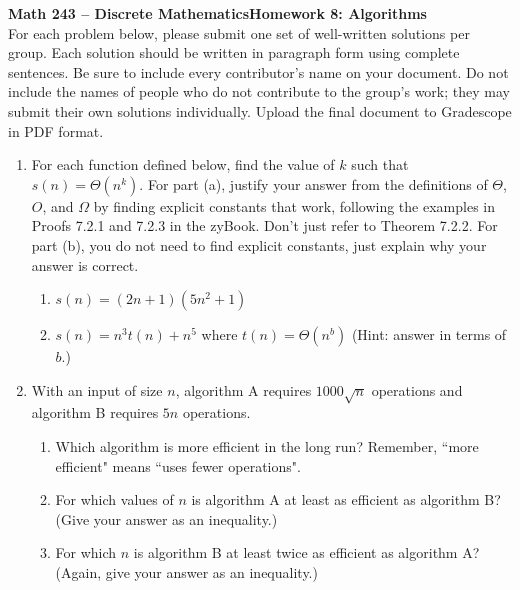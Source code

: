 \documentclass{article}
\begin{document}
\noindent\textbf{Math 243 -- Discrete Mathematics}\hfill\textbf{Homework 8: Algorithms }\\[0.0625in]

For each problem below, please submit one set of well-written solutions per group.  Each solution should be written in paragraph form using complete sentences. Be sure to include every contributor's name on your document.  Do not include the names of people who do not contribute to the group's work; they may submit their own solutions individually. Upload the final document to Gradescope in PDF format.


\begin{enumerate} 

\item For each function defined below, find the value of $k$ such that $s(n)=\Theta(n^{k})$. For part (a), justify your answer from the definitions of $\Theta$, $O$, and $\Omega$ by finding explicit constants that work, following the examples in Proofs 7.2.1 and 7.2.3 in the zyBook. Don't just refer to Theorem 7.2.2. For part (b), you do not need to find explicit constants, just explain why your answer is correct.  

\begin{enumerate}
\item $s(n)=(2n+1)(5n^{2}+1)$
\item $s(n)=n^{3}t(n)+n^{5}$ where $t(n)=\Theta(n^{b})$ (Hint: answer in
terms of $b$.)
\end{enumerate}

\item With an input of size $n$, algorithm A requires $1000\sqrt{n}$ operations
and algorithm B requires $5n$ operations. 

\begin{enumerate}
\item Which algorithm is more efficient in the long run?  Remember, ``more efficient" means ``uses fewer operations".
\item For which values of $n$ is algorithm A at least as efficient as algorithm B?  (Give your answer as an inequality.)
\item For which $n$ is algorithm B at least twice as efficient as algorithm A? (Again, give your answer as an inequality.)
\end{enumerate}


\end{enumerate}
\end{document}
